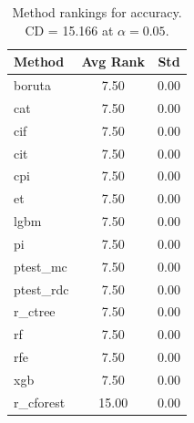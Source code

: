 \begin{table}[h]
\centering
\caption{Method rankings for accuracy. CD = 15.166 at $\alpha=0.05$.}
\label{tab:ranks_accuracy}
\begin{tabular}{lcc}
\toprule
Method & Avg Rank & Std \\
\midrule
boruta & 7.50 & 0.00 \\
cat & 7.50 & 0.00 \\
cif & 7.50 & 0.00 \\
cit & 7.50 & 0.00 \\
cpi & 7.50 & 0.00 \\
et & 7.50 & 0.00 \\
lgbm & 7.50 & 0.00 \\
pi & 7.50 & 0.00 \\
ptest_mc & 7.50 & 0.00 \\
ptest_rdc & 7.50 & 0.00 \\
r_ctree & 7.50 & 0.00 \\
rf & 7.50 & 0.00 \\
rfe & 7.50 & 0.00 \\
xgb & 7.50 & 0.00 \\
r_cforest & 15.00 & 0.00 \\
\bottomrule
\end{tabular}
\end{table}